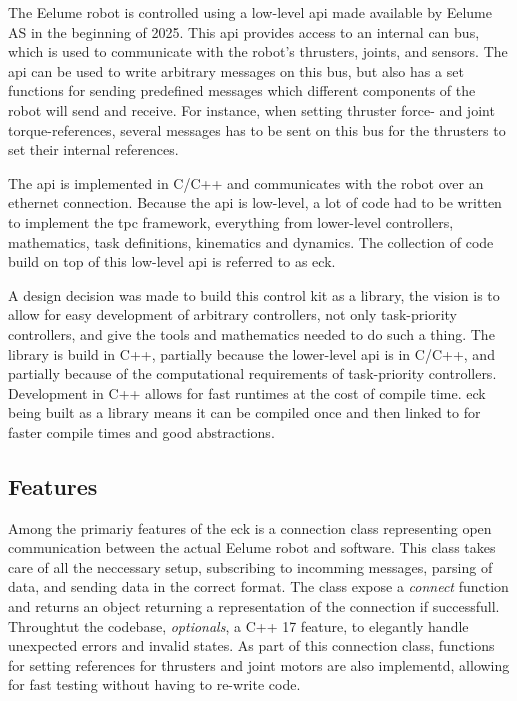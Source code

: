 The Eelume robot is controlled using a low-level \gls{api} made available by Eelume AS
in the beginning of 2025. This \gls{api} provides access to an internal \gls{can} bus, which is used to
communicate with the robot's thrusters, joints, and sensors. The \gls{api} can
be used to write arbitrary messages on this bus, but also has a set functions
for sending predefined messages which different components of the robot will
send and receive. For instance, when setting thruster force- and joint
torque-references, several messages has to be sent on this bus for the
thrusters to set their internal references.

The \gls{api} is implemented in C/C++ and communicates with the robot over
an ethernet connection. Because the \gls{api} is low-level, a lot of code had
to be written to implement the \gls{tpc} framework, everything from
lower-level controllers, mathematics, task definitions, kinematics and dynamics.
The collection of code build on top of this low-level \gls{api} is referred to as \gls{eck}.

A design decision was made to build this control kit as a library, the vision
is to allow for easy development of arbitrary controllers, not only task-priority
controllers, and give the tools and mathematics needed to do such a thing. The library
is build in C++, partially because the lower-level api is in C/C++, and partially because
of the computational requirements of task-priority controllers. Development in
C++ allows for fast runtimes at the cost of compile time. \Gls{eck} being built
as a library means it can be compiled once and then linked to for faster compile
times and good abstractions.

\subsection{Features}

Among the primariy features of the \gls{eck} is a connection class representing
open communication between the actual Eelume robot and software. This class takes
care of all the neccessary setup, subscribing to incomming messages, parsing of data,
and sending data in the correct format. The class expose a \textit{connect} function
and returns an object returning a representation of the connection if successfull. 
Throughtut the codebase, \textit{optionals}, a C++ 17 feature, to elegantly handle
unexpected errors and invalid states. As part of this connection class, functions
for setting references for thrusters and joint motors are also implementd, allowing
for fast testing without having to re-write code.


